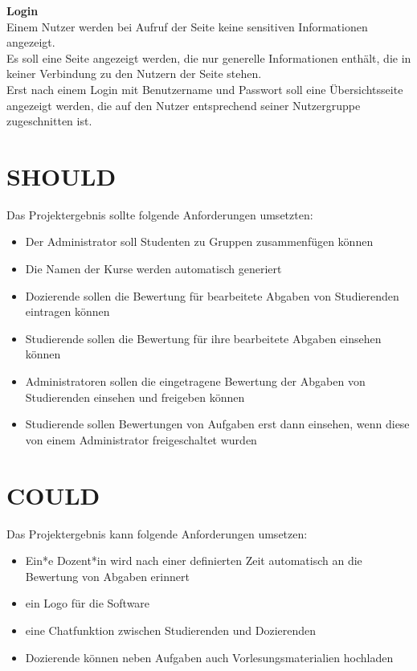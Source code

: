 \textbf{Login} \\
Einem Nutzer werden bei Aufruf der Seite keine sensitiven Informationen angezeigt. \\
Es soll eine Seite angezeigt werden, die nur generelle Informationen enthält, die in keiner Verbindung zu den Nutzern der Seite stehen. \\
Erst nach einem Login mit Benutzername und Passwort soll eine Übersichtsseite angezeigt werden, die auf den Nutzer entsprechend seiner Nutzergruppe zugeschnitten ist. \\

\section{SHOULD}
Das Projektergebnis sollte folgende Anforderungen umsetzten:
\begin{itemize}
\item Der Administrator soll Studenten zu Gruppen zusammenfügen können
\item Die Namen der Kurse werden automatisch generiert
\item Dozierende sollen die Bewertung für bearbeitete Abgaben von Studierenden eintragen können
\item Studierende sollen die Bewertung für ihre bearbeitete Abgaben einsehen können
\item Administratoren sollen die eingetragene Bewertung der Abgaben von Studierenden einsehen und freigeben können
\item Studierende sollen Bewertungen von Aufgaben erst dann einsehen, wenn diese von einem Administrator freigeschaltet wurden
\end{itemize}


\section{COULD}
Das Projektergebnis kann folgende Anforderungen umsetzen:
\begin{itemize}
\item Ein*e Dozent*in wird nach einer definierten Zeit automatisch an die Bewertung von Abgaben erinnert
\item ein Logo für die Software
\item eine Chatfunktion zwischen Studierenden und Dozierenden
\item Dozierende können neben Aufgaben auch Vorlesungsmaterialien hochladen
\end{itemize}





